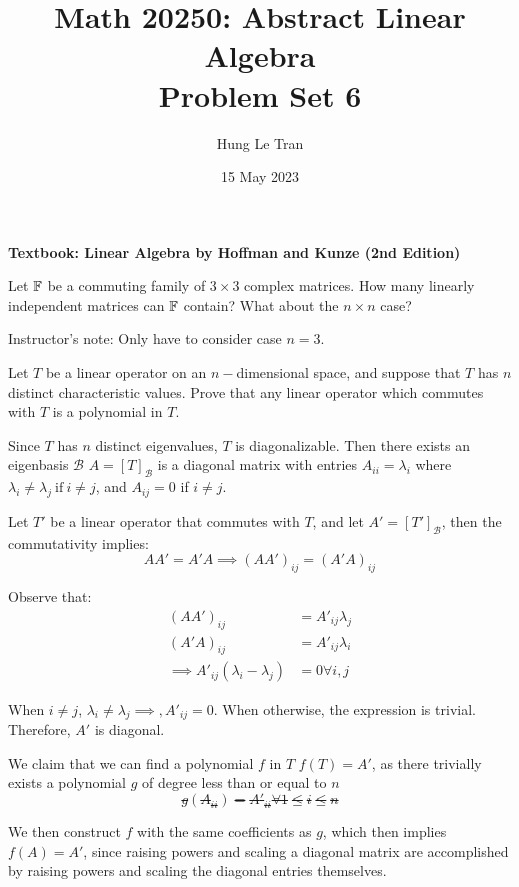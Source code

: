 \documentclass[a4paper, 10pt]{article}
\title{Math 20250: Abstract Linear Algebra \\ \large Problem Set 6}
\date{15 May 2023}
\author{Hung Le Tran}
\begin{document}
\maketitle
\setcounter{section}{6}
\textbf{Textbook: Linear Algebra by Hoffman and Kunze (2nd Edition)}
\begin{problem} 
Let \(\mathbb{F}\) be a commuting family of \( 3 \times 3 \) complex matrices. How many linearly independent matrices can \(\mathbb{F}\) contain? What about the \(n \times n \) case?

Instructor's note: Only have to consider case \(n=3\).
\end{problem}
\begin{solution}
\end{solution}
\begin{problem} 
Let \(T\) be a linear operator on an \(n-\)dimensional space, and suppose that \(T\) has \(n\) distinct characteristic values. Prove that any linear operator which commutes with \(T\) is a polynomial in \(T\).
\end{problem}
\begin{solution}
    Since \(T\) has \(n\) distinct eigenvalues, \(T\) is diagonalizable. Then there exists an eigenbasis \(\mathcal{B}\) \st \(A = [T]_\mathcal{B}\) is a diagonal matrix with entries \(A_{ii} = \lambda_i\) where \(\lambda_i \neq \lambda_j \:\text{if}\: i \neq j\), and \(A_{ij} = 0\) if \(i \neq j\).

    Let \(T'\) be a linear operator that commutes with \(T\), and let \(A' = [T']_\mathcal{B}\), then the commutativity implies: \[
        A A' = A' A \implies (AA')_{ij} = (A'A)_{ij}
    \]

    Observe that:
    \begin{align*}
        (AA')_{ij}                              & = A'_{ij}\lambda_j \\
        (A'A)_{ij}                              & = A'_{ij}\lambda_i \\
        \implies A'_{ij}(\lambda_i - \lambda_j) & = 0 \forall i, j
    \end{align*}

    When \(i \neq j\), \(\lambda_i \neq \lambda_j \implies, A'_{ij} = 0\). When otherwise, the expression is trivial. Therefore, \(A'\) is diagonal.

    We claim that we can find a polynomial \(f\) in \(T\) \st \(f(T) = A'\), as there trivially exists a polynomial \(g\) of degree less than or equal to \(n\) \st \[g(A_{ii}) = A'_{ii} \forall 1 \leq i \leq n\]

    We then construct \(f\) with the same coefficients as \(g\), which then implies \(f(A) = A'\), since raising powers and scaling a diagonal matrix are accomplished by raising powers and scaling the diagonal entries themselves.

\end{solution}
\end{document}
